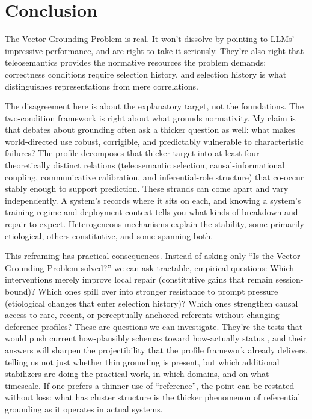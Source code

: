 \documentclass[12pt]{article}
\begin{document}
\section{Conclusion}
\label{sec:conclusion}

The Vector Grounding Problem is real. It won't dissolve by pointing to LLMs' impressive performance, and \textcite{coelho_mollo_milliere_2026_vector_grounding_problem} are right to take it seriously. They're also right that teleosemantics provides the normative resources the problem demands: correctness conditions require selection history, and selection history is what distinguishes representations from mere correlations.

The disagreement here is about the explanatory target, not the foundations. The two-condition framework is right about what grounds normativity. My claim is that debates about grounding often ask a thicker question as well: what makes world-directed use robust, corrigible, and predictably vulnerable to characteristic failures? The profile decomposes that thicker target into at least four theoretically distinct relations (teleosemantic selection, causal-informational coupling, communicative calibration, and inferential-role structure) that co-occur stably enough to support prediction. These strands can come apart and vary independently. A system's  records where it sits on each, and knowing a system's training regime and deployment context tells you what kinds of breakdown and repair to expect. Heterogeneous mechanisms explain the stability, some primarily etiological, others constitutive, and some spanning both.

This reframing has practical consequences. Instead of asking only \enquote{Is the Vector Grounding Problem solved?} we can ask tractable, empirical questions: Which interventions merely improve local repair (constitutive gains that remain session-bound)? Which ones spill over into stronger resistance to prompt pressure (etiological changes that enter selection history)? Which ones strengthen causal access to rare, recent, or perceptually anchored referents without changing deference profiles? These are questions we can investigate. They're the tests that would push current how-plausibly schemas toward how-actually status \citep[95]{craver_darden_2013_in_search_of_mechanisms}, and their answers will sharpen the projectibility that the profile framework already delivers, telling us not just whether thin grounding is present, but which additional stabilizers are doing the practical work, in which domains, and on what timescale. If one prefers a thinner use of \enquote{reference}, the point can be restated without loss: what has cluster structure is the thicker phenomenon of referential grounding as it operates in actual systems.
\end{document}
